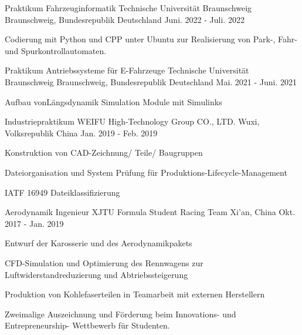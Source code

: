 \begin{cventries}
  \cventry
  {Praktikum Fahrzeuginformatik} %
  {Technische Universität Braunschweig} %
  {Braunschweig, Bundesrepublik Deutschland} %
  {Juni. 2022 - Juli. 2022} %
  {
    \begin{cvitems} %
      \item {Codierung mit Python und CPP unter Ubuntu zur Realisierung von Park-, Fahr- und Spurkontrollautomaten.}
    \end{cvitems}
  }

  \cventry
  {Praktikum Antriebssysteme für E-Fahrzeuge} %
  {Technische Universität Braunschweig} %
  {Braunschweig, Bundesrepublik Deutschland} %
  {Mai. 2021 - Juni. 2021} %
  {
    \begin{cvitems} %
      \item {Aufbau vonLängsdynamik Simulation Module  mit Simulinks}
    \end{cvitems}
  }

  \cventry
  {Industriepraktikum} %
  {WEIFU High-Technology Group CO., LTD.} %
  {Wuxi, Volksrepublik China} %
  {Jan. 2019 - Feb. 2019} %
  {
    \begin{cvitems} %
      \item {Konstruktion von CAD-Zeichnung/ Teile/ Baugruppen}
      \item {Dateiorganisation und System Prüfung für Produktions-Lifecycle-Management}
      \item {IATF 16949 Dateiklassifizierung}
    \end{cvitems}
  }

  \cventry
  {Aerodynamik Ingenieur} %
  {XJTU Formula Student Racing Team} %
  {Xi'an, China} %
  {Okt. 2017 - Jan. 2019} %
  {
    \begin{cvitems} %
      \item {Entwurf der Karosserie und des Aerodynamikpakets}
      \item {CFD-Simulation und Optimierung des Rennwagens zur Luftwiderstandreduzierung und Abtriebssteigerung}
      \item {Produktion von Kohlefaserteilen in Teamarbeit mit externen Herstellern}
      \item {Zweimalige Auszeichnung und Förderung beim Innovations- und Entrepreneurship- Wettbewerb für Studenten.}
    \end{cvitems}
  }

\end{cventries}
